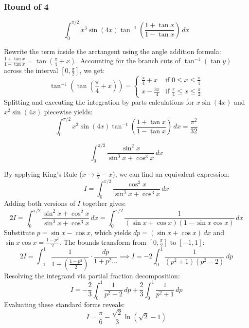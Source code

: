 \subsubsection*{Round of 4}

\begin{questions}

\question
\[ \int_{0}^{\pi/2} x^3 \sin(4x) \tan^{-1} \left( \frac{1 + \tan x}{1 - \tan x} \right) \,dx \]
\begin{solution}
Rewrite the term inside the arctangent using the angle addition formula: $\frac{1 + \tan x}{1 - \tan x} = \tan\left(\frac{\pi}{4} + x\right)$. 
Accounting for the branch cuts of $\tan^{-1}(\tan y)$ across the interval $[0, \frac{\pi}{2}]$, we get:
\[ \tan^{-1}\left(\tan\left(\frac{\pi}{4} + x\right)\right) = \begin{cases} \frac{\pi}{4} + x & \text{if } 0 \le x \le \frac{\pi}{4} \\ x - \frac{3\pi}{4} & \text{if } \frac{\pi}{4} \le x \le \frac{\pi}{2} \end{cases} \]
Splitting and executing the integration by parts calculations for $x \sin(4x)$ and $x^2 \sin(4x)$ piecewise yields:
\[ \int_{0}^{\pi/2} x^3 \sin(4x) \tan^{-1} \left( \frac{1 + \tan x}{1 - \tan x} \right) \,dx = \frac{\pi^2}{32} \]
\end{solution}

\question
\[ \int_{0}^{\pi/2} \frac{\sin^2 x}{\sin^3 x + \cos^3 x} \,dx \]
\begin{solution}
By applying King's Rule ($x \to \frac{\pi}{2} - x$), we can find an equivalent expression:
\[ I = \int_{0}^{\pi/2} \frac{\cos^2 x}{\sin^3 x + \cos^3 x} \,dx \]
Adding both versions of $I$ together gives:
\[ 2I = \int_{0}^{\pi/2} \frac{\sin^2 x + \cos^2 x}{\sin^3 x + \cos^3 x} \,dx = \int_{0}^{\pi/2} \frac{1}{(\sin x + \cos x)(1 - \sin x \cos x)} \,dx \]
Substitute $p = \sin x - \cos x$, which yields $dp = (\sin x + \cos x) \,dx$ and $\sin x \cos x = \frac{1-p^2}{2}$. The bounds transform from $[0, \frac{\pi}{2}]$ to $[-1, 1]$:
\[ 2I = \int_{-1}^{1} \frac{1}{1 + \left(\frac{1-p^2}{2}\right)} \cdot \frac{dp}{1+p^2 \dots} \implies I = -2 \int_{0}^{1} \frac{1}{(p^2 + 1)(p^2 - 2)} \,dp \]
Resolving the integrand via partial fraction decomposition:
\[ I = -\frac{2}{3} \int_{0}^{1} \frac{1}{p^2 - 2} \,dp + \frac{2}{3} \int_{0}^{1} \frac{1}{p^2 + 1} \,dp \]
Evaluating these standard forms reveals:
\[ I = \frac{\pi}{6} - \frac{\sqrt{2}}{3} \ln(\sqrt{2} - 1) \]
\end{solution}

\end{questions}

